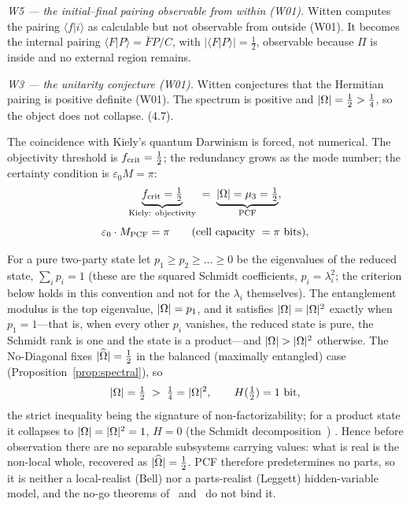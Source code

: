 \emph{W5 --- the initial--final pairing observable from within (W01).} Witten computes the
pairing $\langle f|i\rangle$ as calculable but not observable from outside (W01). It
becomes the internal pairing $\langle F|P\rangle=\bar F P/C$, with
$|\langle F|P\rangle|=\tfrac12$, observable because $\Pi$ is inside and no external region
remains.

\emph{W3 --- the unitarity conjecture (W01).} Witten conjectures that the Hermitian
pairing is positive definite (W01). The spectrum is positive and $|\Omega|=\tfrac12>\tfrac14$, so the object does not collapse.
(4.7).

The coincidence with Kiely's quantum Darwinism is forced, not numerical. The objectivity
threshold is $f_{\rm crit}=\tfrac12$; the redundancy grows as the mode number; the
certainty condition is $\varepsilon_0 M=\pi$:
\begin{equation}\label{eq:obs-threshold}
  \underbrace{f_{\mathrm{crit}}=\tfrac12}_{\text{Kiely: objectivity}}
   \;=\;\underbrace{|\Omega|=\mu_3=\tfrac12}_{\text{PCF}},
\end{equation}\begin{equation}\label{eq:obs-certainty}
  \varepsilon_{0}\cdot M_{\mathrm{PCF}}=\pi\qquad(\text{cell capacity }=\pi\text{ bits}),
\end{equation}
\begin{proposition}\label{prop:no-parts}
For a pure two-party state let $p_1\ge p_2\ge\dots\ge0$ be the eigenvalues of the reduced state,
$\sum_i p_i=1$ (these are the squared Schmidt coefficients, $p_i=\lambda_i^2$; the criterion below
holds in this convention and not for the $\lambda_i$ themselves). The entanglement modulus is the
top eigenvalue, $|\Omega|=p_1$, and it satisfies $|\Omega|=|\Omega|^{2}$ exactly when $p_1=1$---that is,
when every other $p_i$ vanishes, the reduced state is pure, the Schmidt rank is one and the state is
a product---and $|\Om|>|\Om|^{2}$ otherwise. The No-Diagonal fixes
$|\widehat{\Omega}|=\tfrac12$ in the balanced (maximally entangled) case
(Proposition~\ref{prop:spectral}), so
\[
  |\Omega|=\tfrac12\;>\;\tfrac14=|\Omega|^{2},\qquad H(\tfrac12)=1\ \text{bit},
\]
the strict inequality being the signature of non-factorizability; for a product state it collapses to
$|\Omega|=|\Omega|^{2}=1$, $H=0$  (the Schmidt decomposition~\cite{Schmidt1907}) . Hence before observation there are no separable subsystems carrying 
values: what is real is the non-local whole, recovered as $|\widehat{\Omega}|=\tfrac12$. PCF therefore
predetermines no parts, so it is neither a local-realist (Bell) nor a parts-realist (Leggett)
hidden-variable model, and the no-go theorems of~\cite{Bell64} and~\cite{Leggett03} do not bind it. 
\end{proposition}

